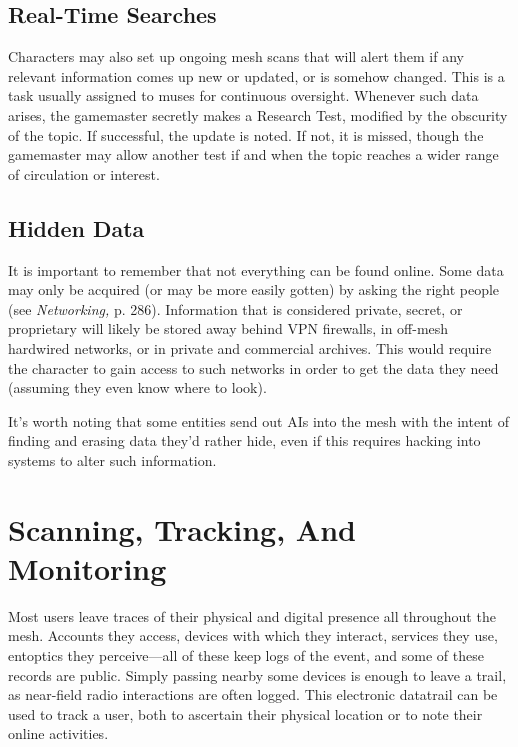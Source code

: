 \subsection{Real-Time Searches}

Characters may also set up ongoing mesh scans that will 
alert them if any relevant information comes up new or 
updated, or is somehow changed. This is a task usually 
assigned to muses for continuous oversight. Whenever 
such data arises, the gamemaster secretly makes a Research
Test, modified by the obscurity of the topic. If
successful, the update is noted. If not, it is missed, though 
the gamemaster may allow another test if and when the 
topic reaches a wider range of circulation or interest.

\subsection{Hidden Data}

It is important to remember that not everything can 
be found online. Some data may only be acquired (or 
may be more easily gotten) by asking the right people 
(see \textit{Networking,} p. 286). Information that is considered
private, secret, or proprietary will likely be stored
away behind VPN firewalls, in off-mesh hardwired 
networks, or in private and commercial archives. This 
would require the character to gain access to such 
networks in order to get the data they need (assuming 
they even know where to look).

It's worth noting that some entities send out AIs 
into the mesh with the intent of finding and erasing 
data they'd rather hide, even if this requires hacking 
into systems to alter such information.

\section{Scanning, Tracking, And Monitoring}

Most users leave traces of their physical and digital 
presence all throughout the mesh. Accounts they access, 
devices with which they interact, services they use, entoptics
they perceive—all of these keep logs of the event,
and some of these records are public. Simply passing 
nearby some devices is enough to leave a trail, as near-field
radio interactions are often logged. This electronic
datatrail can be used to track a user, both to ascertain 
their physical location or to note their online activities.

